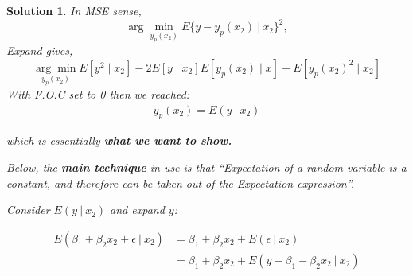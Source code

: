 \documentclass[9pt]{tufte-handout}
\newcommand{\solution}[1]{{\color{NavyBlue} #1}}
\newtheorem*{Solution}{Solution}
\begin{document}
\solution{\begin{Solution}
\normalfont
In MSE sense,
\begin{equation*}
\arg\min_{y_{p}( x_{2})} E\{y-y_{p}( x_{2}) \ |\ x_{2}\}^{2} ,
\end{equation*}
Expand gives,
\begin{equation*}
\underset{y_{p}( x_{2})}{\arg\min} E\left[ y^{2} \mid x_{2}\right] -2E[y\mid x_{2} ]E[y_{p}( x_{2}) \mid x]+E\left[ y_{p}( x_{2})^{2} \mid x_{2}\right]
\end{equation*}
With F.O.C set to 0 then we reached:
\begin{align*}
	y_{p}( x_{2}) =E( y\ |\ x_{2}) \tag{*} \label{eq:*}
\end{align*}

which is essentially \textbf{what we want to show.}

Below, the \textbf{main technique} in use is that ``Expectation of a random variable is a constant, and therefore can be taken out of the Expectation expression''. \par 
Consider $\displaystyle E( y\ |\ x_{2})$ and expand $\displaystyle y$:

\begin{align*}
E( \beta _{1} +\beta _{2} x_{2} +\epsilon \ |\ x_{2}) & =\beta _{1} +\beta _{2} x_{2} +E( \epsilon \ |\ x_{2})\\
 & =\beta _{1} +\beta _{2} x_{2} +E( y-\beta _{1} -\beta _{2} x_{2} \ |\ x_{2}) \tag{2.1} \label{eq:2.1}
\end{align*}


\end{Solution}}
\end{document}
